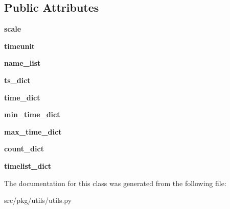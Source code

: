 \subsection*{Public Attributes}
\begin{DoxyCompactItemize}
\item 
\mbox{\label{classrnb-planning_1_1src_1_1pkg_1_1utils_1_1utils_1_1_global_timer_abd9978d3bda1fbdb9d3874fc55ebd017}} 
{\bfseries scale}
\item 
\mbox{\label{classrnb-planning_1_1src_1_1pkg_1_1utils_1_1utils_1_1_global_timer_a861ede3ba39d6900403a2cc88ce63e8b}} 
{\bfseries timeunit}
\item 
\mbox{\label{classrnb-planning_1_1src_1_1pkg_1_1utils_1_1utils_1_1_global_timer_a8e78cdcf05bce5661e67f6058ad49dc4}} 
{\bfseries name\+\_\+list}
\item 
\mbox{\label{classrnb-planning_1_1src_1_1pkg_1_1utils_1_1utils_1_1_global_timer_a8923c165caa41bc2c7208cabae9e3c23}} 
{\bfseries ts\+\_\+dict}
\item 
\mbox{\label{classrnb-planning_1_1src_1_1pkg_1_1utils_1_1utils_1_1_global_timer_ab740ae368c70560ce5b9865d4c37e454}} 
{\bfseries time\+\_\+dict}
\item 
\mbox{\label{classrnb-planning_1_1src_1_1pkg_1_1utils_1_1utils_1_1_global_timer_af5cdf2eb1bad1a3b00d3f4a35f17768d}} 
{\bfseries min\+\_\+time\+\_\+dict}
\item 
\mbox{\label{classrnb-planning_1_1src_1_1pkg_1_1utils_1_1utils_1_1_global_timer_ac5dc237142af2e0521fb2bd69746a692}} 
{\bfseries max\+\_\+time\+\_\+dict}
\item 
\mbox{\label{classrnb-planning_1_1src_1_1pkg_1_1utils_1_1utils_1_1_global_timer_a8b615f5d198abed8b33a9f05d5992f7e}} 
{\bfseries count\+\_\+dict}
\item 
\mbox{\label{classrnb-planning_1_1src_1_1pkg_1_1utils_1_1utils_1_1_global_timer_a9428b421290234f85171cd52c2465fe2}} 
{\bfseries timelist\+\_\+dict}
\end{DoxyCompactItemize}


The documentation for this class was generated from the following file\+:\begin{DoxyCompactItemize}
\item 
src/pkg/utils/utils.\+py\end{DoxyCompactItemize}
